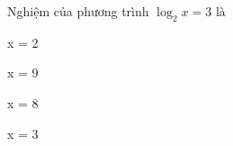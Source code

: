 \begin{question}[type=multiple_choice,difficulty=1,code={I-12}]
Nghiệm của phương trình $ \log_{2} x = 3 $ là

\begin{choice}[label=A]
x = 2
\end{choice}

\begin{choice}[label=B]
x = 9
\end{choice}

\begin{choice}[correct,label=C]
x = 8
\end{choice}

\begin{choice}[label=D]
x = 3
\end{choice}

\end{question}